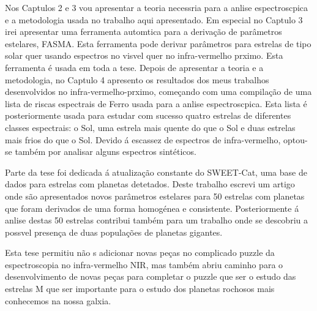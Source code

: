 \documentclass[fleqn]{fcup-thesis}
\begin{document}
\begin{preliminary}
\begin{abstract-pt}
Nos Cap\’{\i}tulos 2 e 3 vou apresentar a teoria necessria para a anlise
espectroscpica e a metodologia usada no trabalho aqui apresentado. Em especial no Cap\’{\i}tulo
3 irei apresentar uma ferramenta automtica para a deriva\c{c}\~{a}o de par\^{a}metros
estelares, FASMA. Esta ferramenta pode derivar par\^{a}metros para estrelas de tipo solar quer
usando espectros no vis\’{\i}vel quer no infra-vermelho prximo. Esta ferramenta \'{e} usada em
toda a tese. Depois de apresentar a teoria e a metodologia, no Cap\’{\i}tulo 4 apresento os
resultados dos meus trabalhos desenvolvidos no infra-vermelho-prximo, come\c{c}ando com uma
compila\c{c}\~{a}o de uma lista de riscas espectrais de Ferro usada para a anlise
espectroscpica. Esta lista \'{e} posteriormente usada para estudar com sucesso quatro estrelas
de diferentes classes espectrais: o Sol, uma estrela mais quente do que o Sol e duas estrelas mais
frios do que o Sol. Devido \'{a} escassez de espectros de infra-vermelho, optou-se tamb\'{e}m por
analisar alguns espectros sint\'{e}ticos.

Parte da tese foi dedicada \'{a} atualiza\c{c}\~{a}o constante do SWEET-Cat, uma base de dados para
estrelas com planetas detetados. Deste trabalho escrevi um artigo onde s\~{a}o apresentados novos
par\^{a}metros estelares para 50 estrelas com planetas que foram derivados de uma forma
homog\'{e}nea e consistente. Posteriormente \'{a} anlise destas 50 estrelas contribui
tamb\'{e}m para um trabalho onde se descobriu a poss\’{\i}vel presen\c{c}a de duas
popula\c{c}\~{o}es de planetas gigantes.

Esta tese permitiu n\~{a}o s adicionar novas pe\c{c}as no complicado puzzle da espectroscopia
no infra-vermelho NIR, mas tamb\'{e}m abriu caminho para o desenvolvimento de novas pe\c{c}as para
completar o puzzle que ser o estudo das estrelas M que ser importante para o estudo dos
planetas rochosos mais conhecemos na nossa galxia.

\end{abstract-pt}



\tableofcontents
{}
\listoftables
{}
\listoffigures

\end{preliminary}










\appendix






% 


\nocite{} %
\end{document}
